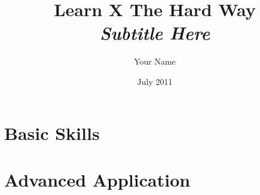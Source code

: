 


\title{
    Learn X The Hard Way\\
    \textit{Subtitle Here}
}
\author{Your Name}
\date{July 2011}



\frontmatter

\maketitle

\tableofcontents



\mainmatter


\part{Basic Skills}




























\part{Advanced Application}




























\appendix



